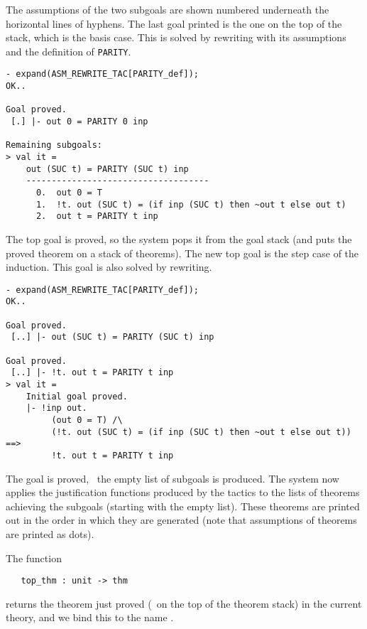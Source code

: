 \noindent The assumptions of the two subgoals
are shown numbered underneath the horizontal lines of hyphens. The
last goal printed is the one on the top of the stack, which is the
basis case. This is solved by rewriting with its assumptions and the
definition of {\small\verb|PARITY|}.


\begin{session}
\begin{verbatim}
- expand(ASM_REWRITE_TAC[PARITY_def]);
OK..

Goal proved.
 [.] |- out 0 = PARITY 0 inp

Remaining subgoals:
> val it =
    out (SUC t) = PARITY (SUC t) inp
    ------------------------------------
      0.  out 0 = T
      1.  !t. out (SUC t) = (if inp (SUC t) then ~out t else out t)
      2.  out t = PARITY t inp
\end{verbatim}
\end{session}

The top goal is proved, so the system pops it from the goal stack (and
puts the proved theorem on a stack of theorems). The new top goal is
the step case of the induction. This goal is also solved by rewriting.

\begin{session}
\begin{verbatim}
- expand(ASM_REWRITE_TAC[PARITY_def]);
OK..

Goal proved.
 [..] |- out (SUC t) = PARITY (SUC t) inp

Goal proved.
 [..] |- !t. out t = PARITY t inp
> val it =
    Initial goal proved.
    |- !inp out.
         (out 0 = T) /\
         (!t. out (SUC t) = (if inp (SUC t) then ~out t else out t)) ==>
         !t. out t = PARITY t inp
\end{verbatim}
\end{session}

\noindent The goal is proved, \ie\ the empty list of subgoals is produced.
The system now applies the justification functions produced by the
tactics to the lists of theorems achieving the subgoals (starting with
the empty list).  These theorems are printed out in the order in which
they are generated (note that assumptions of theorems are printed as
dots).

The \ML{} function

{\small\begin{verbatim}
   top_thm : unit -> thm
\end{verbatim}}

\noindent
returns the theorem just proved (\ie\ on the top of the theorem stack)
in the current theory, and we bind this to the \ML{} name
.

